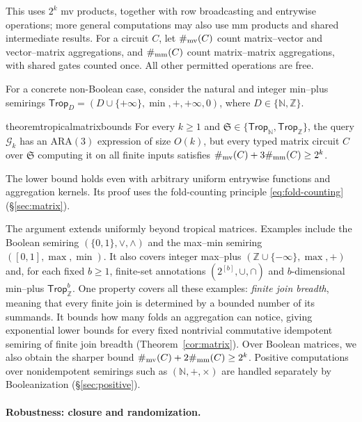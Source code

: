 This uses $2^k$ mv products, together with row broadcasting and
entrywise operations; more general computations may also use mm
products and shared intermediate results.
For a circuit $C$, let $\#_{\mathrm{mv}}(C)$ count matrix--vector and
vector--matrix aggregations, and $\#_{\mathrm{mm}}(C)$ count matrix--matrix
aggregations, with shared gates counted once. All other permitted
operations are free.

For a concrete non-Boolean case, consider the natural and integer
min--plus semirings
$\mathsf{Trop}_D=(D\cup\{+\infty\},\min,+,+\infty,0)$,
where $D\in\{\mathbb N,\mathbb Z\}$.

\begin{restatable}{theorem}{tropicalmatrixbounds}\label{thm:tropical-matrix}
For every $k\ge1$ and $\mathfrak S\in\{\mathsf{Trop}_{\mathbb N},\mathsf{Trop}_{\mathbb Z}\}$,
the query $\mathcal G_k$ has an ARA$(3)$ expression of size $O(k)$,
but every typed matrix circuit $C$ over $\mathfrak S$ computing it
on all finite inputs satisfies $\#_{\mathrm{mv}}(C)+3\#_{\mathrm{mm}}(C)\ge2^k$.
\end{restatable}
The lower bound holds even with arbitrary uniform entrywise functions
and aggregation kernels. Its proof uses the fold-counting principle
\eqref{eq:fold-counting} (\S\ref{sec:matrix}).

The argument extends uniformly beyond tropical matrices.
Examples include the Boolean semiring $(\{0,1\},\lor,\land)$
and the max--min semiring $([0,1],\max,\min)$.
It also covers integer max--plus
$(\mathbb Z\cup\{-\infty\},\max,+)$ and, for each fixed $b\ge1$,
finite-set annotations $(2^{[b]},\cup,\cap)$ and $b$-dimensional
min--plus $\mathsf{Trop}_{\mathbb Z}^{b}$.
One property covers all these examples: \emph{finite join breadth},
meaning that every finite join is determined by a bounded number
of its summands. It bounds how many folds an aggregation can notice,
giving exponential lower bounds for every fixed nontrivial
commutative idempotent semiring of finite join breadth
(Theorem~\ref{cor:matrix}). Over Boolean matrices, we also obtain
the sharper bound $\#_{\mathrm{mv}}(C)+2\#_{\mathrm{mm}}(C)\ge2^k$.
Positive computations over nonidempotent semirings such as
$(\mathbb N,+,\times)$ are handled separately by Booleanization
(\S\ref{sec:positive}).

\paragraph{Robustness: closure and randomization.}

